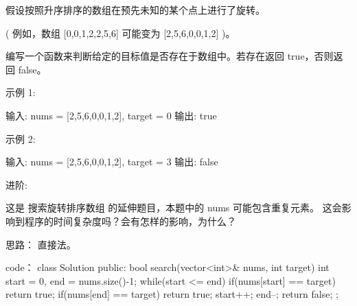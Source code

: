 假设按照升序排序的数组在预先未知的某个点上进行了旋转。

( 例如，数组 [0,0,1,2,2,5,6] 可能变为 [2,5,6,0,0,1,2] )。

编写一个函数来判断给定的目标值是否存在于数组中。若存在返回 true，否则返回 false。

示例 1:

输入: nums = [2,5,6,0,0,1,2], target = 0
输出: true

示例 2:

输入: nums = [2,5,6,0,0,1,2], target = 3
输出: false

进阶:

    这是 搜索旋转排序数组 的延伸题目，本题中的 nums  可能包含重复元素。
    这会影响到程序的时间复杂度吗？会有怎样的影响，为什么？
















思路：
直接法。



























code：
class Solution {
public:
    bool search(vector<int>& nums, int target) {
        int start = 0, end = nums.size()-1;
        while(start <= end)
        {
            if(nums[start] == target) return true;
            if(nums[end] == target) return true;
            start++;
            end--;
        }
        return false;
    }
};